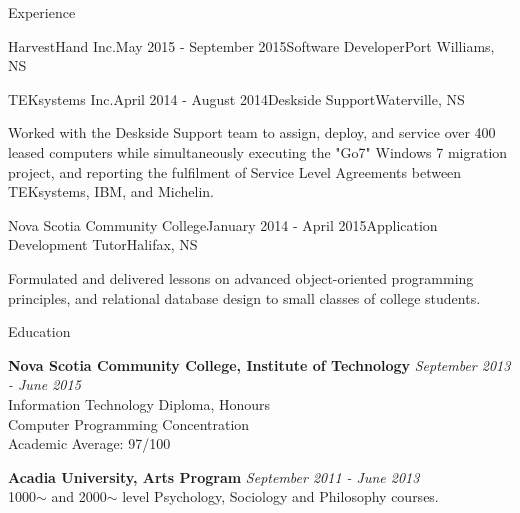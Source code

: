 \documentclass{resume} %
\begin{document}
\begin{rSection}{Experience}
\begin{rSubsection}{HarvestHand Inc.}{May 2015 - September 2015}{Software Developer}{Port Williams, NS}
\end{rSubsection}


\begin{rSubsection}{TEKsystems Inc.}{April 2014 - August 2014}{Deskside Support}{Waterville, NS}
\item[] Worked with the Deskside Support team to assign, deploy, and service over 400 leased computers while simultaneously executing the "Go7" Windows 7 migration project, and reporting the fulfilment of Service Level Agreements between TEKsystems, IBM, and Michelin.
\end{rSubsection}


\begin{rSubsection}{Nova Scotia Community College}{January 2014 - April 2015}{Application Development Tutor}{Halifax, NS}

\item[] Formulated and delivered lessons on advanced object-oriented programming principles, and relational database design to small classes of college students.
\end{rSubsection}


\end{rSection}



\begin{rSection}{Education}

{\bf Nova Scotia Community College, Institute of Technology} \hfill {\em September 2013 - June 2015} \\ 
Information Technology Diploma, Honours \\
Computer Programming Concentration \smallskip \\
Academic Average: 97/100

{\bf Acadia University, Arts Program} \hfill {\em September 2011 - June 2013} \\ 
1000$\sim$ and 2000$\sim$ level Psychology, Sociology and Philosophy courses.\\

\end{rSection}


\end{document}
